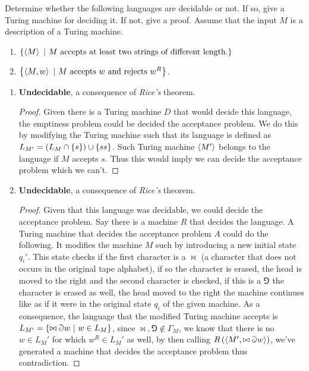 \documentclass{article}
\begin{document}
\begin{exercise}
Determine whether the following languages are decidable or not. If so, give a Turing machine for deciding it. If not, give a proof. Assume that the input $M$ is a description of a Turing machine.
\begin{enumerate}
 \item $\left\{ \left\langle M \right\rangle\ |\ \mbox{$M$ accepts at least two strings of different length.} \right\}$
 \item $\left\{ \left\langle M,w \right\rangle\ |\ \mbox{$M$ accepts $w$ and rejects $w^R$} \right\}$.
\end{enumerate}
\end{exercise}
\begin{answer}
\begin{enumerate}
 \item \textbf{Undecidable}, a consequence of \emph{Rice's} theorem.
 \begin{proof}
  Given there is a Turing machine $D$ that would decide this language, the emptiness problem could be decided the acceptance problem. We do this by modifying the Turing machine such that its language is defined as $L_{M'}=\left( L_M\cap\left\{ s \right\} \right)\cup\left\{ ss \right\}$. Such Turing machine $\left\langle M' \right\rangle$ belongs to the language if $M$ accepts $s$. Thus this would imply we can decide the acceptance problem which we can't.
 \end{proof}
 \item \textbf{Undecidable}, a consequence of \emph{Rice's} theorem.
 \begin{proof}Given that this language was decidable, we could decide the acceptance problem. Say there is a machine $R$ that decides the language. A Turing machine that decides the acceptance problem $A$ could do the following. It modifies the machine $M$ such by introducing a new initial state $q_i'$. This state checks if the first character is a $\bowtie$ (a character that does not occurs in the original tape alphabet), if so the character is erased, the head is moved to the right and the second character is checked, if this is a $\Game$ the character is erased as well, the head moved to the right the machine continues like as if it were in the original state $q_i$ of the given machine. As a consequence, the language that the modified Turing machine accepts is $L_{M'}=\left\{ \bowtie\Game w\ |\ w\in L_M \right\}$, since $\bowtie,\Game\notin\Gamma_M$, we know that there is no $w\in L_M'$ for which $w^R\in L_M'$ as well, by then calling $R\left( \left\langle M',\bowtie\Game w \right\rangle \right)$, we've generated a machine that decides the acceptance problem thus contradiction.\end{proof}
\end{enumerate}
\end{answer}
\end{document}
